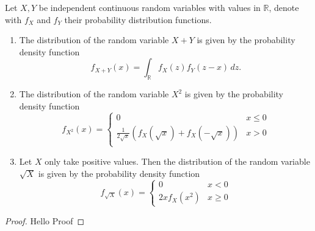 \begin{lemma} \label{lemma:transform_random_variable} 
  Let $X,Y$ be independent continuous random variables with values in
  $\mathbb{R}$, denote with $f_X$ and $f_Y$ their probability
  distribution functions.%
  \begin{enumerate}[label=(\arabic*),ref=(\arabic*), itemsep=-0.4cm]
    \item The distribution of the random variable $X+Y$ is given by
      the probability density function%
      \[%
        f_{X+Y}(x) = \int_{\mathbb{R}} f_X(z) f_Y(z-x)\, dz.  
      \]%
    \item The distribution of the random variable $X^2$ is given by
      the probability density function
      \[
        f_{X^2}(x) = %
        \begin{cases} 
          0     & x \leq 0 \\
          \frac{1}{2\sqrt{x}}\left(f_X(\sqrt{x})+f_X(-\sqrt{x})\right)
           & x > 0 \\
        \end{cases}
      \]
    \item Let $X$ only take positive values. Then the distribution of
      the random variable $\sqrt{X}$ is given by the probability
      density function
      \[
        f_{\sqrt{X}}(x) = %
        \begin{cases}
          0   & x < 0 \\
          2x f_X(x^2) & x \geq 0 
        \end{cases}
      \]
  \end{enumerate}
\end{lemma}
%
\begin{proof}
Hello Proof
\end{proof}

